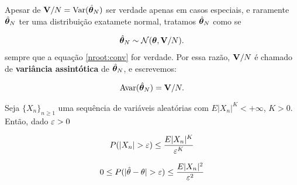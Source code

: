 \documentclass[11pt, oneside, a4paper, article]{article}
\numberwithin{equation}{section}
\begin{document}
\begin{description}
\begin{remark}
	Apesar de $\mathbf{V}/N = \text{Var}(\hat{\boldsymbol{\theta}}_{N})$ ser verdade apenas em casos especiais, e raramente $\hat{\boldsymbol{\theta}}_{N}$ ter uma distribuição exatamete normal, tratamos $\hat{\boldsymbol{\theta}}_{N}$ como se 

\vspace{-1 em}
\begin{align}\label{eq:3.4}
\hat{\boldsymbol{\theta}}_{N} \sim \mathcal{N}(\boldsymbol{\theta}, \mathbf{V}/N).
\end{align}
sempre que a equação \eqref{nroot:conv} for verdade.
Por essa razão, $\mathbf{V}/N$ é chamado de \textbf{variância assintótica} de $\hat{\boldsymbol{\theta}}_{N}$, e escrevemos:

\vspace{-1 em}
\begin{align}\label{eq:3.5}
	\text{Avar}(\hat{\boldsymbol{\theta}}_{N}) = \mathbf{V}/N.
\end{align}

\end{remark}

\hline
\vspace{1 ex}

\begin{defn}

Seja
$\{ X_{n} \}_{n \geq 1}$ 
uma sequência de variáveis aleatórias com
$E|X_{n}|^{K} < +\infty$, $K>0$. 
Então, dado $\varepsilon >0$

\vspace{-1 em}
\begin{align*}
	P(| X_{n} | > \varepsilon ) \leq \frac{E|X_{n}|^{K}}{\varepsilon^{K}}
\end{align*}
\end{defn}

\begin{defn} %

\begin{align*}
0 \leq P(| \hat{\theta} - \theta | > \varepsilon ) \leq \frac{E|X_{n}|^{2}}{\varepsilon^{2}}
\end{align*}
\end{defn}


\end{description}
\end{document}
